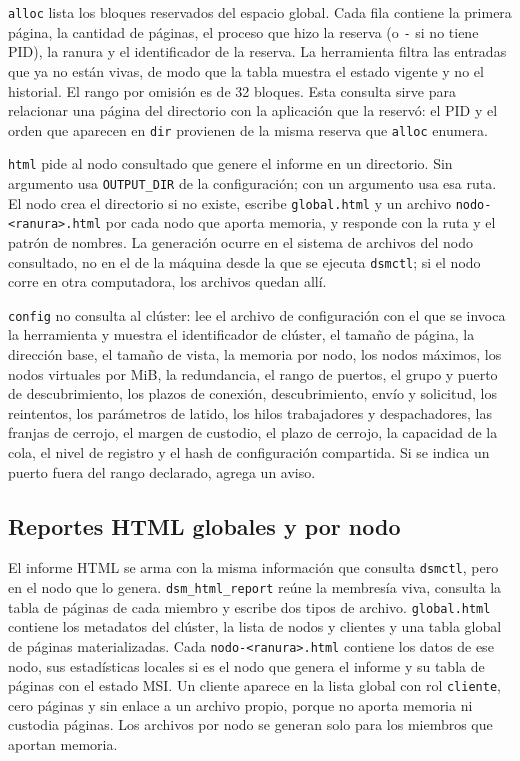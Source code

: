 \texttt{alloc} lista los bloques reservados del espacio global. Cada fila contiene la primera página, la cantidad de páginas, el proceso que hizo la reserva (o \texttt{-} si no tiene PID), la ranura y el identificador de la reserva. La herramienta filtra las entradas que ya no están vivas, de modo que la tabla muestra el estado vigente y no el historial. El rango por omisión es de 32 bloques. Esta consulta sirve para relacionar una página del directorio con la aplicación que la reservó: el PID y el orden que aparecen en \texttt{dir} provienen de la misma reserva que \texttt{alloc} enumera.

\texttt{html} pide al nodo consultado que genere el informe en un directorio. Sin argumento usa \texttt{OUTPUT\_DIR} de la configuración; con un argumento usa esa ruta. El nodo crea el directorio si no existe, escribe \texttt{global.html} y un archivo \texttt{nodo-<ranura>.html} por cada nodo que aporta memoria, y responde con la ruta y el patrón de nombres. La generación ocurre en el sistema de archivos del nodo consultado, no en el de la máquina desde la que se ejecuta \texttt{dsmctl}; si el nodo corre en otra computadora, los archivos quedan allí.

\texttt{config} no consulta al clúster: lee el archivo de configuración con el que se invoca la herramienta y muestra el identificador de clúster, el tamaño de página, la dirección base, el tamaño de vista, la memoria por nodo, los nodos máximos, los nodos virtuales por MiB, la redundancia, el rango de puertos, el grupo y puerto de descubrimiento, los plazos de conexión, descubrimiento, envío y solicitud, los reintentos, los parámetros de latido, los hilos trabajadores y despachadores, las franjas de cerrojo, el margen de custodio, el plazo de cerrojo, la capacidad de la cola, el nivel de registro y el hash de configuración compartida. Si se indica un puerto fuera del rango declarado, agrega un aviso.

\subsection{Reportes HTML globales y por nodo}\label{sec:reportes-html}

El informe HTML se arma con la misma información que consulta \texttt{dsmctl}, pero en el nodo que lo genera. \texttt{dsm\_html\_report} reúne la membresía viva, consulta la tabla de páginas de cada miembro y escribe dos tipos de archivo. \texttt{global.html} contiene los metadatos del clúster, la lista de nodos y clientes y una tabla global de páginas materializadas. Cada \texttt{nodo-<ranura>.html} contiene los datos de ese nodo, sus estadísticas locales si es el nodo que genera el informe y su tabla de páginas con el estado MSI. Un cliente aparece en la lista global con rol \texttt{cliente}, cero páginas y sin enlace a un archivo propio, porque no aporta memoria ni custodia páginas. Los archivos por nodo se generan solo para los miembros que aportan memoria.

